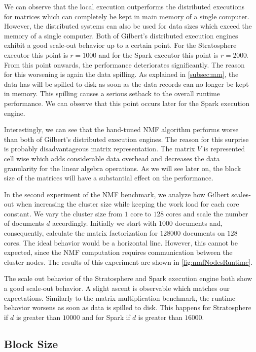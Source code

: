 We can observe that the local execution outperforms the distributed executions for matrices which can completely be kept in main memory of a single computer.
However, the distributed systems can also be used for data sizes which exceed the memory of a single computer.
Both of Gilbert's distributed execution engines exhibit a good scale-out behavior up to a certain point.
For the Stratosphere executor this point is $r=1000$ and for the Spark executor this point is $r=2000$.
From this point onwards, the performance deteriorates significantly.
The reason for this worsening is again the data spilling.
As explained in \cref{subsec:mm}, the data has will be spilled to disk as soon as the data records can no longer be kept in memory.
This spilling causes a serious setback to the overall runtime performance.
We can observe that this point occurs later for the Spark execution engine.

Interestingly, we can see that the hand-tuned NMF algorithm performs worse than both of Gilbert's distributed execution engines.
The reason for this surprise is probably disadvantageous matrix representation.
The matrix $V$ is represented cell wise which adds considerable data overhead and decreases the data granularity for the linear algebra operations.
As we will see later on, the block size of the matrices will have a substantial effect on the performance.

In the second experiment of the NMF benchmark, we analyze how Gilbert scales-out when increasing the cluster size while keeping the work load for each core constant.
We vary the cluster size from $1$ core to $128$ cores and scale the number of documents $d$ accordingly.
Initially we start with $1000$ documents and, consequently, calculate the matrix factorization for $128000$ documents on $128$ cores.
The ideal behavior would be a horizontal line.
However, this cannot be expected, since the NMF computation requires communication between the cluster nodes.
The results of this experiment are shown in \cref{fig:nmfNodesRuntime}.

The scale out behavior of the Stratosphere and Spark execution engine both show a good scale-out behavior.
A slight ascent is observable which matches our expectations.
Similarly to the matrix multiplication benchmark, the runtime behavior worsens as soon as data is spilled to disk.
This happens for Stratosphere if $d$ is greater than $10000$ and for Spark if $d$ is greater than $16000$.

\subsection{Block Size}

